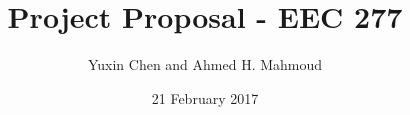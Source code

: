 \documentclass[12pt] {article}
\begin{document}
\title{Project Proposal - EEC 277}
\author{Yuxin Chen and Ahmed H. Mahmoud}
\date{21 February 2017} 
\maketitle













\end{document}
